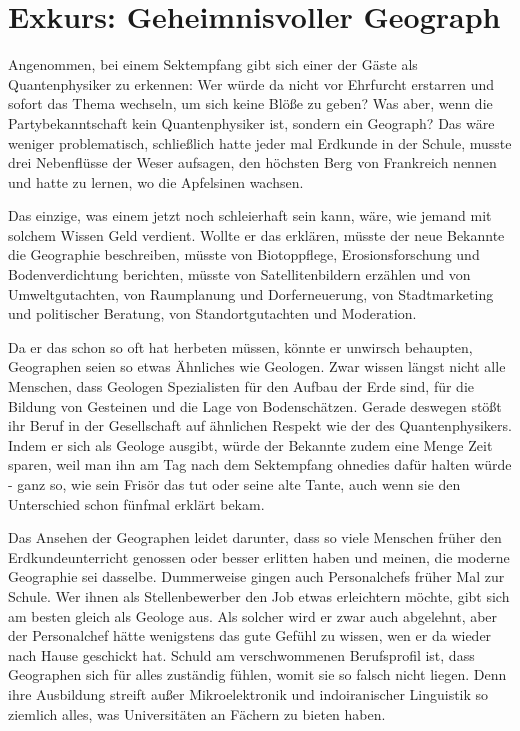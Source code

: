 \section*{Exkurs: Geheimnisvoller Geograph}
Angenommen, bei einem Sektempfang gibt sich einer der Gäste als Quantenphysiker zu erkennen: Wer würde da nicht vor Ehrfurcht erstarren und sofort das Thema wechseln, um sich keine Blöße zu geben? Was aber, wenn die Partybekanntschaft kein Quantenphysiker ist, sondern ein Geograph? Das wäre weniger problematisch, schließlich hatte jeder mal Erdkunde in der Schule, musste drei Nebenﬂüsse der Weser aufsagen, den höchsten Berg von Frankreich nennen und hatte zu lernen, wo die Apfelsinen wachsen.

Das einzige, was einem jetzt noch schleierhaft sein kann, wäre, wie jemand mit solchem Wissen Geld verdient. Wollte er das erklären, müsste der neue Bekannte die Geographie beschreiben, müsste von Biotoppﬂege, Erosionsforschung und Bodenverdichtung berichten, müsste von Satellitenbildern erzählen und von Umweltgutachten, von Raumplanung und Dorferneuerung, von Stadtmarketing und politischer Beratung, von Standortgutachten und Moderation.

Da er das schon so oft hat herbeten müssen, könnte er unwirsch behaupten, Geographen seien so etwas Ähnliches wie Geologen. Zwar wissen längst nicht alle Menschen, dass Geologen Spezialisten für den Aufbau der Erde sind, für die Bildung von Gesteinen und die Lage von Bodenschätzen. Gerade deswegen stößt ihr Beruf in der Gesellschaft auf ähnlichen Respekt wie der des Quantenphysikers. Indem er sich als Geologe ausgibt, würde der Bekannte zudem eine Menge Zeit sparen, weil man ihn am Tag nach dem Sektempfang ohnedies dafür halten würde - ganz so, wie sein Frisör das tut oder seine alte Tante, auch wenn sie den Unterschied schon fünfmal erklärt bekam.

Das Ansehen der Geographen leidet darunter, dass so viele Menschen früher den Erdkundeunterricht genossen oder besser erlitten haben und meinen, die moderne Geographie sei dasselbe. Dummerweise gingen auch Personalchefs früher Mal zur Schule. Wer ihnen als Stellenbewerber den Job etwas erleichtern möchte, gibt sich am besten gleich als Geologe aus. Als solcher wird er zwar auch abgelehnt, aber der Personalchef hätte wenigstens das gute Gefühl zu wissen, wen er da wieder nach Hause geschickt hat. Schuld am verschwommenen Berufsproﬁl ist, dass Geographen sich für alles zuständig fühlen, womit sie so falsch nicht liegen. Denn ihre Ausbildung streift außer Mikroelektronik und indoiranischer Linguistik so ziemlich alles, was Universitäten an Fächern zu bieten haben.

